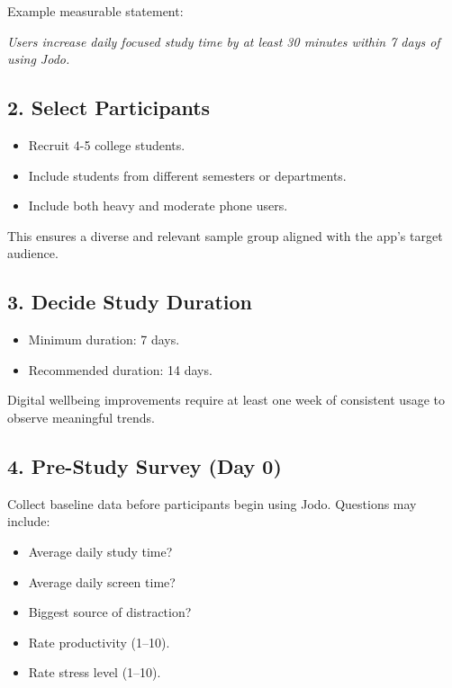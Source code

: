 \documentclass[12pt]{article}
\begin{document}
Example measurable statement:

\textit{Users increase daily focused study time by at least 30 minutes within 7 days of using Jodo.}

\subsection{2. Select Participants}

\begin{itemize}
    \item Recruit 4-5 college students.
    \item Include students from different semesters or departments.
    \item Include both heavy and moderate phone users.
\end{itemize}

This ensures a diverse and relevant sample group aligned with the app’s target audience.

\subsection{3. Decide Study Duration}

\begin{itemize}
    \item Minimum duration: 7 days.
    \item Recommended duration: 14 days.
\end{itemize}

Digital wellbeing improvements require at least one week of consistent usage to observe meaningful trends.

\subsection{4. Pre-Study Survey (Day 0)}

Collect baseline data before participants begin using Jodo. Questions may include:

\begin{itemize}
    \item Average daily study time?
    \item Average daily screen time?
    \item Biggest source of distraction?
    \item Rate productivity (1--10).
    \item Rate stress level (1--10).
\end{itemize}
\end{document}
